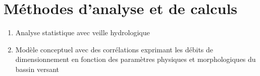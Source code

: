 \section{Méthodes d'analyse et de calculs}
\begin{enumerate}
    \item Analyse statistique avec veille hydrologique
    \item Modèle conceptuel avec des corrélations exprimant les débits de dimensionnement en fonction des paramètres physiques et morphologiques du bassin versant
\end{enumerate}